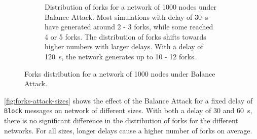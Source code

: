 \begin{figure}[h]
\begin{subfigure}{\textwidth}
		\vspace*{0.25cm}
		\caption{
			Distribution of forks for a network of \num{1000} nodes under Balance Attack.
			Most simulations with delay of \SI{30}{\second} have generated around \num{2} - \num{3} forks, while some reached \num{4} or \num{5} forks.
			The distribution of forks shifts towards higher numbers with larger delays.
			With a delay of \SI{120}{\second}, the network generates up to \num{10} - \num{12} forks.
		}
		\vspace*{0.25cm}
	\end{subfigure}
	\caption[Forks distribution for a network of 1000 nodes under Balance Attack]{
		Forks distribution for a network of \num{1000} nodes under Balance Attack.
	}
	\label{fig:forks-attack-delay-1000}
\end{figure}

\medskip
\cref{fig:forks-attack-sizes} shows the effect of the Balance Attack for a fixed delay of \texttt{Block} messages on network of different sizes.
With both a delay of \num{30} and \SI{60}{\second}, there is no significant difference in the distribution of forks for the different networks.
For all sizes, longer delays cause a higher number of forks on average.

